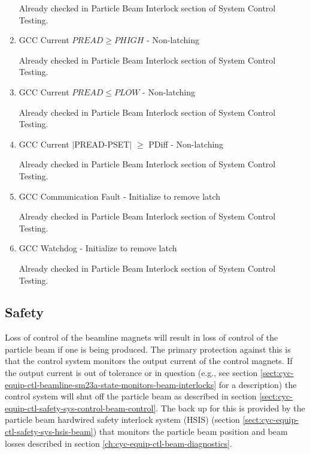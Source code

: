 \documentclass[11pt]{book}		%
\begin{document}
\begin{enumerate}
\color{red}
Already checked in Particle Beam Interlock section of System Control Testing.
\color{black}

 \item GCC Current $PREAD \geq PHIGH$ - Non-latching

\color{red}
Already checked in Particle Beam Interlock section of System Control Testing.
\color{black}

 \item GCC Current $PREAD \leq PLOW$ - Non-latching

\color{red}
Already checked in Particle Beam Interlock section of System Control Testing.
\color{black}

 \item GCC Current $\mid$PREAD-PSET$\mid$  $\geq$ PDiff - Non-latching

\color{red}
Already checked in Particle Beam Interlock section of System Control Testing.
\color{black}

 \item GCC Communication Fault - Initialize to remove latch

\color{red}
Already checked in Particle Beam Interlock section of System Control Testing.
\color{black}

 \item GCC Watchdog - Initialize to remove latch

\color{red}
Already checked in Particle Beam Interlock section of System Control Testing.
\color{black}

\end{enumerate}


\subsection{Safety}

Loss of control of the beamline magnets will result in loss of control of the particle beam if one is being produced.  The primary protection against this is that the control system monitors the output current of the control magnets.  If the output current is out of tolerance or in question (e.g., see section \ref{sect:cyc-equip-ctl-beamline-sm23a-state-monitors-beam-interlocks} for a description) the control system will shut off the particle beam as described in section \ref{sect:cyc-equip-ctl-safety-sys-control-beam-control}.  The back up for this is provided by the particle beam hardwired safety interlock system (HSIS) (section \ref{sect:cyc-equip-ctl-safety-sys-hsis-beam}) that monitors the particle beam position and beam losses described in section \ref{ch:cyc-equip-ctl-beam-diagnostics}.
\end{document}
